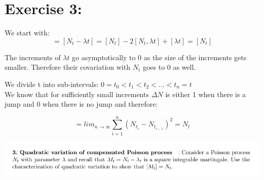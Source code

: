 \documentclass[document.tex]{subfiles}
\begin{document}
\section*{Exercise 3:}

We start with:
\begin{equation}
[M_t] = [N_t - \lambda t] = [N_t] - 2[N_t, \lambda t] + [\lambda t] = [N_t]
\end{equation}

The increments of $\lambda t$ go asymptotically to 0 as the size of the increments gets smaller. Therefore their covariation with $N_t$ goes to 0 as well.

We divide t into sub-intervals: $0 = t_0 < t_1 < t_2 < ... < t_n = t$ \\

We know that for sufficiently small increments $\Delta N$ is either 1 when there is a jump and 0 when there is no jump and therefore:

\begin{equation}
[N_t] = lim_{n \to \infty} \sum_{i = 1}^n (N_{t_i} - N_{t_{i - 1}})^2 = N_t
\end{equation}


\includegraphics[width=\textwidth]{ex3.png}
\end{document}
